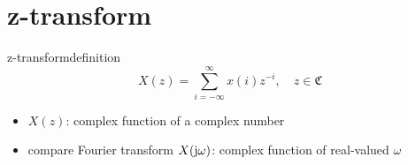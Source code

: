 \section{z-transform}
	\begin{frame}{z-transform}{definition}
        \begin{equation*}
            X(z) = \sum\limits_{i=-\infty}^{\infty}{x(i)z^{-i}},\quad z\in \mathfrak{C}
        \end{equation*}
        \begin{itemize}
            \item<2->   $X(z)$: complex function of a complex number
            \item<3->   compare Fourier transform $X(\mathrm{j}\omega)$: complex function of real-valued $\omega$
        \end{itemize}
	\end{frame}
